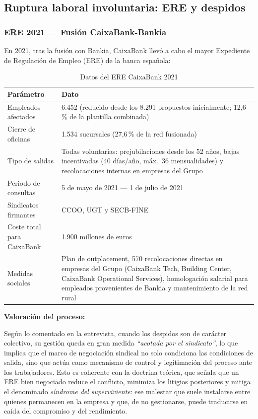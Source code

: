 \subsection{Ruptura laboral involuntaria: ERE y despidos}

\subsubsection{ERE 2021 --- Fusión CaixaBank-Bankia}

En 2021, tras la fusión con Bankia, CaixaBank llevó a cabo el mayor
Expediente de Regulación de Empleo (ERE) de la banca española:

\begin{table}[H]
  \centering
  \small
  \caption{Datos del ERE CaixaBank 2021}
  \begin{tabularx}{\textwidth}{lX}
    \toprule
    \textbf{Parámetro}           & \textbf{Dato} \\
    \midrule
    Empleados afectados           & 6.452 (reducido desde los 8.291 propuestos inicialmente; 12,6\,\% de la plantilla combinada) \\
    Cierre de oficinas            & 1.534 sucursales (27,6\,\% de la red fusionada) \\
    Tipo de salidas               & Todas voluntarias: prejubilaciones desde los 52 años, bajas incentivadas (40 días/año, máx.\ 36 mensualidades) y recolocaciones internas en empresas del Grupo \\
    Periodo de consultas          & 5 de mayo de 2021 --- 1 de julio de 2021 \\
    Sindicatos firmantes          & CCOO, UGT y SECB-FINE \\
    Coste total para CaixaBank    & 1.900 millones de euros \\
    Medidas sociales              & Plan de outplacement, 570 recolocaciones directas en empresas del Grupo (CaixaBank Tech, Building Center, CaixaBank Operational Services), homologación salarial para empleados provenientes de Bankia y mantenimiento de la red rural \\
    \bottomrule
  \end{tabularx}
\end{table}


\textbf{Valoración del proceso:}

Según lo comentado en la entrevista, cuando los despidos son de carácter
colectivo, su gestión queda en gran medida \textit{``acotada por el sindicato''},
lo que implica que el marco de negociación sindical no solo condiciona las
condiciones de salida, sino que actúa como mecanismo de control y legitimación
del proceso ante los trabajadores. Esto es coherente con la doctrina teórica,
que señala que un ERE bien negociado reduce el conflicto, minimiza los litigios
posteriores y mitiga el denominado \textit{síndrome del superviviente}: ese
malestar que suele instalarse entre quienes permanecen en la empresa y que,
de no gestionarse, puede traducirse en caída del compromiso y del rendimiento.

